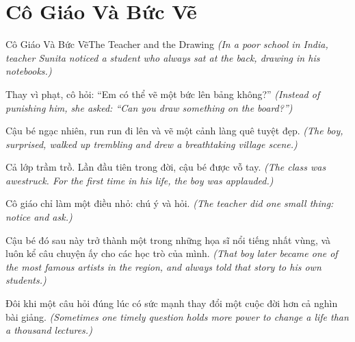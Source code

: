 \section{Cô Giáo Và Bức Vẽ}
\begin{truyen}{Cô Giáo Và Bức Vẽ}{The Teacher and the Drawing}
\textit{(In a poor school in India, teacher Sunita noticed a student who always sat at the back, drawing in his notebooks.)}

Thay vì phạt, cô hỏi: ``Em có thể vẽ một bức lên bảng không?''
\textit{(Instead of punishing him, she asked: ``Can you draw something on the board?'')}

Cậu bé ngạc nhiên, run run đi lên và vẽ một cảnh làng quê tuyệt đẹp.
\textit{(The boy, surprised, walked up trembling and drew a breathtaking village scene.)}

Cả lớp trầm trồ. Lần đầu tiên trong đời, cậu bé được vỗ tay.
\textit{(The class was awestruck. For the first time in his life, the boy was applauded.)}

Cô giáo chỉ làm một điều nhỏ: chú ý và hỏi.
\textit{(The teacher did one small thing: notice and ask.)}

Cậu bé đó sau này trở thành một trong những họa sĩ nổi tiếng nhất vùng, và luôn kể câu chuyện ấy cho các học trò của mình.
\textit{(That boy later became one of the most famous artists in the region, and always told that story to his own students.)}

\end{truyen}

\begin{baihoc}
Đôi khi một câu hỏi đúng lúc có sức mạnh thay đổi một cuộc đời hơn cả nghìn bài giảng.
\textit{(Sometimes one timely question holds more power to change a life than a thousand lectures.)}
\end{baihoc}
\ngancach

